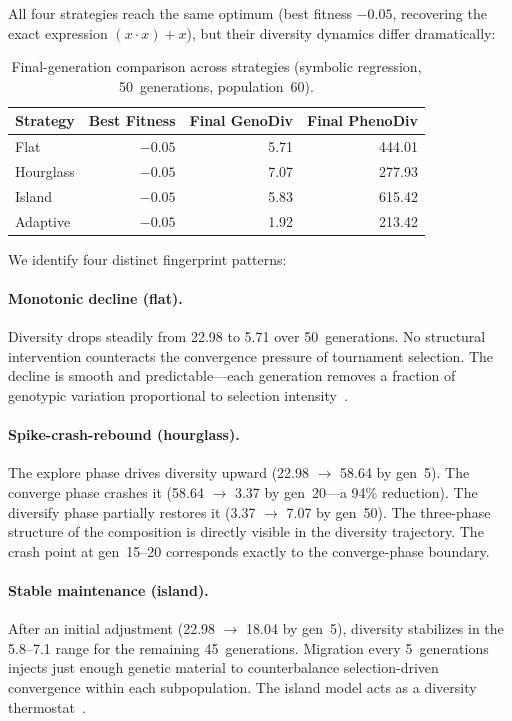 \documentclass[sigconf,anonymous]{acmart}
\begin{document}
All four strategies reach the same optimum (best fitness $-0.05$, recovering the exact expression $(x \cdot x) + x$), but their diversity dynamics differ dramatically:

\begin{table}[ht]
\centering
\caption{Final-generation comparison across strategies (symbolic regression, 50~generations, population~60).}
\label{tab:sr-final}
\begin{tabular}{@{}lrrr@{}}
\toprule
\textbf{Strategy} & \textbf{Best Fitness} & \textbf{Final GenoDiv} & \textbf{Final PhenoDiv} \\
\midrule
Flat      & $-0.05$ & 5.71  & 444.01 \\
Hourglass & $-0.05$ & 7.07  & 277.93 \\
Island    & $-0.05$ & 5.83  & 615.42 \\
Adaptive  & $-0.05$ & 1.92  & 213.42 \\
\bottomrule
\end{tabular}
\end{table}

We identify four distinct fingerprint patterns:

\paragraph{Monotonic decline (flat).}
Diversity drops steadily from 22.98 to 5.71 over 50~generations. No structural intervention counteracts the convergence pressure of tournament selection. The decline is smooth and predictable---each generation removes a fraction of genotypic variation proportional to selection intensity~\cite{blickle1996comparison, crepinsek2013exploration}.

\paragraph{Spike-crash-rebound (hourglass).}
The explore phase drives diversity upward (22.98 $\to$ 58.64 by gen~5). The converge phase crashes it (58.64 $\to$ 3.37 by gen~20---a 94\% reduction). The diversify phase partially restores it (3.37 $\to$ 7.07 by gen~50). The three-phase structure of the composition is directly visible in the diversity trajectory. The crash point at gen~15--20 corresponds exactly to the converge-phase boundary.

\paragraph{Stable maintenance (island).}
After an initial adjustment (22.98 $\to$ 18.04 by gen~5), diversity stabilizes in the 5.8--7.1 range for the remaining 45~generations. Migration every 5~generations injects just enough genetic material to counterbalance selection-driven convergence within each subpopulation. The island model acts as a diversity thermostat~\cite{whitley1999island}.
\end{document}
